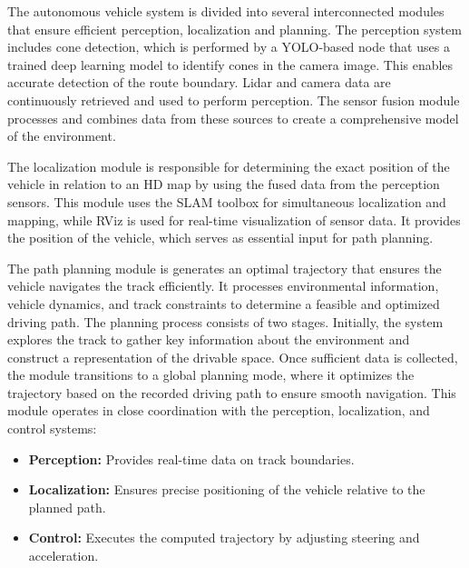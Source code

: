The autonomous vehicle system is divided into several interconnected modules that ensure efficient perception, localization and planning. 
The perception system includes cone detection, which is performed by a YOLO-based node that uses a trained deep learning model to identify cones in the camera image. This enables accurate detection of the route boundary. 
Lidar and camera data are continuously retrieved and used to perform perception. The sensor fusion module processes and combines data from these sources to create a comprehensive model of the environment.

The localization module is responsible for determining the exact position of the vehicle in relation to an HD map by using the fused data from the perception sensors. 
This module uses the SLAM toolbox for simultaneous localization and mapping, while RViz is used for real-time visualization of sensor data. It provides the position of the vehicle, which serves as essential input for path planning.

The path planning module is generates an optimal trajectory that ensures the vehicle navigates the track efficiently. It processes environmental information, vehicle dynamics, and track constraints to determine a feasible and optimized driving path.
The planning process consists of two stages. Initially, the system explores the track to gather key information about the environment and construct a representation of the drivable space. Once sufficient data is collected, the module transitions to a global planning mode, where it optimizes the trajectory based on the recorded driving path to ensure smooth navigation. 
This module operates in close coordination with the perception, localization, and control systems:
\begin{itemize}
    \item \textbf{Perception:} Provides real-time data on track boundaries.
    \item \textbf{Localization:} Ensures precise positioning of the vehicle relative to the planned path.
    \item \textbf{Control:} Executes the computed trajectory by adjusting steering and acceleration.
\end{itemize}